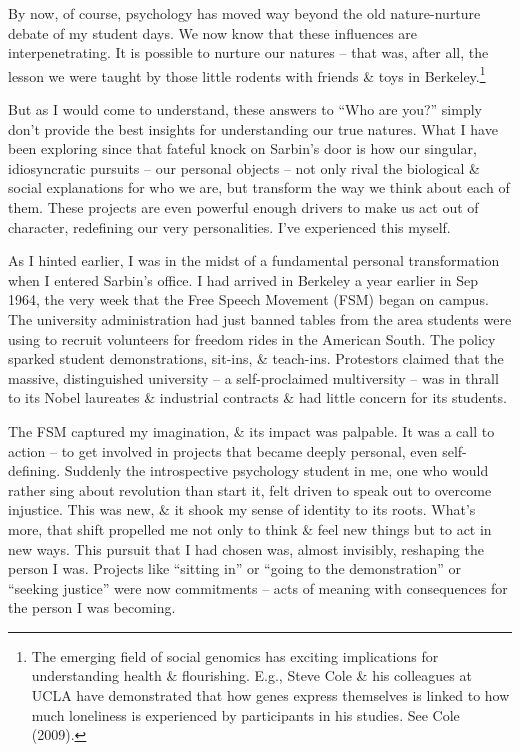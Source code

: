\documentclass{article}
\numberwithin{equation}{section}
\begin{document}
By now, of course, psychology has moved way beyond the old nature-nurture debate of my student days. We now know that these influences are interpenetrating. It is possible to nurture our natures -- that was, after all, the lesson we were taught by those little rodents with friends \& toys in Berkeley.\footnote{The emerging field of social genomics has exciting implications for understanding health \& flourishing. E.g., Steve Cole \& his colleagues at UCLA have demonstrated that how genes express themselves is linked to how much loneliness is experienced by participants in his studies. See Cole (2009).}

But as I would come to understand, these answers to ``Who are you?'' simply don't provide the best insights for understanding our true natures. What I have been exploring since that fateful knock on Sarbin's door is how our singular, idiosyncratic pursuits -- our personal objects -- not only rival the biological \& social explanations for who we are, but transform the way we think about each of them. These projects are even powerful enough drivers to make us act out of character, redefining our very personalities. I've experienced this myself.

As I hinted earlier, I was in the midst of a fundamental personal transformation when I entered Sarbin's office. I had arrived in Berkeley a year earlier in Sep 1964, the very week that the Free Speech Movement (FSM) began on campus. The university administration had just banned tables from the area students were using to recruit volunteers for freedom rides in the American South. The policy sparked student demonstrations, sit-ins, \& teach-ins. Protestors claimed that the massive, distinguished university -- a self-proclaimed multiversity -- was in thrall to its Nobel laureates \& industrial contracts \& had little concern for its students.

The FSM captured my imagination, \& its impact was palpable. It was a call to action -- to get involved in projects that became deeply personal, even self-defining. Suddenly the introspective psychology student in me, one who would rather sing about revolution than start it, felt driven to speak out to overcome injustice. This was new, \& it shook my sense of identity to its roots. What's more, that shift propelled me not only to think \& feel new things but to act in new ways. This pursuit that I had chosen was, almost invisibly, reshaping the person I was. Projects like ``sitting in'' or ``going to the demonstration'' or ``seeking justice'' were now commitments -- acts of meaning with consequences for the person I was becoming.
\end{document}
